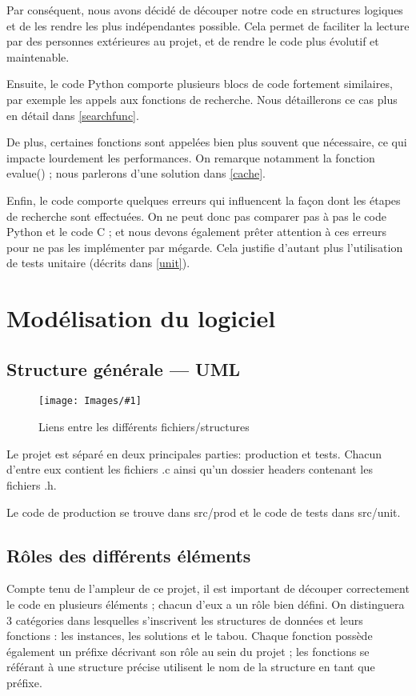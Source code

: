 \documentclass[hideweeklyreports]{polytech/polytech}
\newcommand{\img}[3]{%
	\begin{figure}[H]
		\centering
   		\texttt{[image: Images/\#1]}
  	 	\caption{#2}
	\end{figure}
}
\begin{document}
			Par conséquent, nous avons décidé de découper notre code en structures logiques et de les rendre les plus indépendantes possible. Cela permet de faciliter la lecture par des personnes extérieures au projet, et de rendre le code plus évolutif et maintenable.
			
			Ensuite, le code Python comporte plusieurs blocs de code fortement similaires, par exemple les appels aux fonctions de recherche. Nous détaillerons ce cas plus en détail dans \autoref{searchfunc}.
			
			De plus, certaines fonctions sont appelées bien plus souvent que nécessaire, ce qui impacte lourdement les performances. On remarque notamment la fonction evalue() ; nous parlerons d'une solution dans \autoref{cache}.
			
			Enfin, le code comporte quelques erreurs qui influencent la façon dont les étapes de recherche sont effectuées. On ne peut donc pas comparer pas à pas le code Python et le code C ; et nous devons également prêter attention à ces erreurs pour ne pas les implémenter par mégarde. Cela justifie d'autant plus l'utilisation de tests unitaire (décrits dans \autoref{unit}).
			
		
	\chapter{Modélisation du logiciel}
		\section{Structure générale — UML}
			\img{UML.png}{Liens entre les différents fichiers/structures}{0.45}
		
			Le projet est séparé en deux principales parties: production et tests. Chacun d'entre eux contient les fichiers .c ainsi qu'un dossier headers contenant les fichiers .h.
			
			Le code de production se trouve dans src/prod et le code de tests dans src/unit.
			
			\begin{minipage}{0.99\textwidth}
			\end{minipage}

		\section{Rôles des différents éléments}
			Compte tenu de l'ampleur de ce projet, il est important de découper correctement le code en plusieurs éléments ; chacun d'eux a un rôle bien défini. On distinguera 3 catégories dans lesquelles s'inscrivent les structures de données et leurs fonctions : les instances, les solutions et le tabou. Chaque fonction possède également un préfixe décrivant
son rôle au sein du projet ; les fonctions se référant à une structure précise utilisent le nom de la structure en tant que préfixe.			
\end{document}

